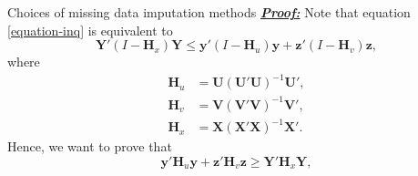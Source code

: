 \begin{frame}{Choices of missing data imputation methods}
\textbf{\textit{\underline{Proof:}}}
Note that equation \eqref{equation-inq} is equivalent to 
\begin{equation}
    \mathbf{Y}'(I-\mathbf{H}_x)\mathbf{Y}\le
    \mathbf{y}'(I-\mathbf{H}_u)\mathbf{y} + \mathbf{z}'(I-\mathbf{H}_v)\mathbf{z},
\end{equation}
where 
\begin{align}
    \mathbf{H}_u &= \mathbf{U}(\mathbf{U}'\mathbf{U})^{-1}\mathbf{U}',\\ 
    \mathbf{H}_v &= \mathbf{V}(\mathbf{V}'\mathbf{V})^{-1}\mathbf{V}', \\
    \mathbf{H}_x &= \mathbf{X}(\mathbf{X}'\mathbf{X})^{-1}\mathbf{X}'.
\end{align}
Hence, we want to prove that 
\begin{equation}
    \mathbf{y}'\mathbf{H}_u \mathbf{y}+\boldsymbol{z}'\mathbf{H}_v \boldsymbol{z}\ge \mathbf{Y}'\mathbf{H}_x\mathbf{Y},
\end{equation}
\end{frame}
